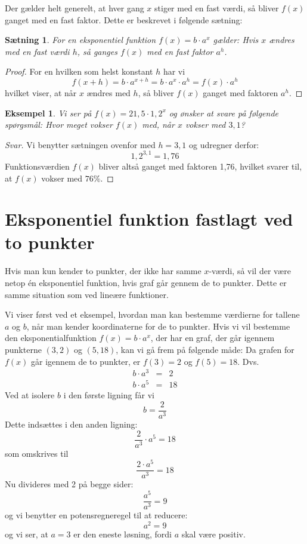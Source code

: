 \documentclass[12pt,oneside,a4paper]{article}
\newcommand{\bas}{\begin{eqnarray*}}
\newcommand{\eas}{\end{eqnarray*}}
\theoremstyle{plain}
\newtheorem*{thm}{Sætning}
\newtheorem*{eks}{Eksempel}
\begin{document}
Der gælder helt generelt, at hver gang $x$ stiger med en fast værdi, så bliver
$f(x)$ ganget med en fast faktor. Dette er beskrevet i følgende sætning:

\begin{thm}
    For en eksponentiel funktion $f(x) = b\cdot a^x$ gælder: Hvis $x$ ændres
    med en fast værdi $h$, så ganges $f(x)$ med en fast faktor $a^h$.
\end{thm}
\begin{proof}
    For en hvilken som helst konstant $h$ har vi
    $$
    f(x+h) = b\cdot a^{x+h} = b\cdot a^x\cdot  a^h = f(x)\cdot  a^h
    $$
    hvilket viser, at når $x$ ændres med $h$, så bliver $f(x)$ ganget med
    faktoren $a^h$. 
\end{proof}

\begin{eks}
    Vi ser på $f(x) = 21,5 \cdot 1,2^x$ og ønsker at svare på følgende
    spørgsmål: Hvor meget vokser $f(x)$ med, når $x$ vokser med $3,1$?
\end{eks}
\begin{proof}[Svar]
    Vi benytter sætningen ovenfor med $h=3,1$ og udregner derfor:
    $$
    1,2^{3,1} = 1,76 
    $$
    Funktionsværdien $f(x)$ bliver altså ganget med faktoren 1,76, hvilket
    svarer til, at $f(x)$ vokser med $76\%$.
\end{proof}


\section*{Eksponentiel funktion fastlagt ved to punkter}
Hvis man kun kender to punkter, der ikke har samme $x$-værdi, så vil der være
netop én eksponentiel funktion,
hvis graf går gennem de to punkter. Dette er samme situation som ved lineære
funktioner.

Vi viser først ved et eksempel, hvordan man kan bestemme værdierne for tallene
$a$ og $b$, når man kender koordinaterne for de to punkter.
Hvis vi vil bestemme den eksponentialfunktion $f(x) = b\cdot a^x$, der har en
graf, der går igennem punkterne $(3, 2)$ og $(5, 18)$, kan vi gå frem på
følgende måde:
Da grafen for $f(x)$ går igennem de to punkter, er $f(3) = 2$ og $f(5) = 18$. Dvs.
\bas
b \cdot a^3  &=& 2\\
b \cdot a^5  &=& 18
\eas
Ved at isolere $b$ i den første ligning får vi
$$
b = \frac{2}{a^3}
$$
Dette indsættes i den anden ligning:
$$
\frac{2}{a^3} \cdot a^5 = 18
$$
som omskrives til
$$
\frac{2 \cdot a^5}{a^3} = 18
$$
Nu divideres med 2 på begge sider:
$$
\frac{a^5}{a^3} = 9
$$
og vi benytter en potensregneregel til at reducere:
$$
a^2 = 9
$$
og vi ser, at $a=3$ er den eneste løsning, fordi $a$ skal være positiv.
\end{document}
